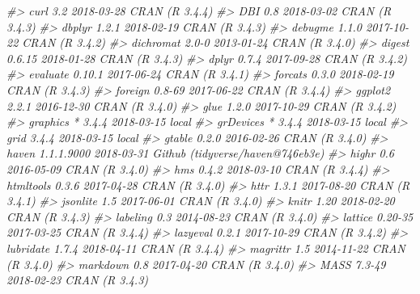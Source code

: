 \documentclass[]{book}
\newenvironment{Shaded}{\begin{snugshade}}{\end{snugshade}}
\newcommand{\CommentTok}[1]{\textcolor[rgb]{0.56,0.35,0.01}{\textit{#1}}}
\theoremstyle{definition}
\theoremstyle{definition}
\theoremstyle{definition}
\theoremstyle{remark}
\begin{document}
\begin{Shaded}
\begin{Highlighting}[]
\CommentTok{#>  curl           3.2        2018-03-28 CRAN (R 3.4.4)                  }
\CommentTok{#>  DBI            0.8        2018-03-02 CRAN (R 3.4.3)                  }
\CommentTok{#>  dbplyr         1.2.1      2018-02-19 CRAN (R 3.4.3)                  }
\CommentTok{#>  debugme        1.1.0      2017-10-22 CRAN (R 3.4.2)                  }
\CommentTok{#>  dichromat      2.0-0      2013-01-24 CRAN (R 3.4.0)                  }
\CommentTok{#>  digest         0.6.15     2018-01-28 CRAN (R 3.4.3)                  }
\CommentTok{#>  dplyr          0.7.4      2017-09-28 CRAN (R 3.4.2)                  }
\CommentTok{#>  evaluate       0.10.1     2017-06-24 CRAN (R 3.4.1)                  }
\CommentTok{#>  forcats        0.3.0      2018-02-19 CRAN (R 3.4.3)                  }
\CommentTok{#>  foreign        0.8-69     2017-06-22 CRAN (R 3.4.4)                  }
\CommentTok{#>  ggplot2        2.2.1      2016-12-30 CRAN (R 3.4.0)                  }
\CommentTok{#>  glue           1.2.0      2017-10-29 CRAN (R 3.4.2)                  }
\CommentTok{#>  graphics     * 3.4.4      2018-03-15 local                           }
\CommentTok{#>  grDevices    * 3.4.4      2018-03-15 local                           }
\CommentTok{#>  grid           3.4.4      2018-03-15 local                           }
\CommentTok{#>  gtable         0.2.0      2016-02-26 CRAN (R 3.4.0)                  }
\CommentTok{#>  haven          1.1.1.9000 2018-03-31 Github (tidyverse/haven@746eb3e)}
\CommentTok{#>  highr          0.6        2016-05-09 CRAN (R 3.4.0)                  }
\CommentTok{#>  hms            0.4.2      2018-03-10 CRAN (R 3.4.4)                  }
\CommentTok{#>  htmltools      0.3.6      2017-04-28 CRAN (R 3.4.0)                  }
\CommentTok{#>  httr           1.3.1      2017-08-20 CRAN (R 3.4.1)                  }
\CommentTok{#>  jsonlite       1.5        2017-06-01 CRAN (R 3.4.0)                  }
\CommentTok{#>  knitr          1.20       2018-02-20 CRAN (R 3.4.3)                  }
\CommentTok{#>  labeling       0.3        2014-08-23 CRAN (R 3.4.0)                  }
\CommentTok{#>  lattice        0.20-35    2017-03-25 CRAN (R 3.4.4)                  }
\CommentTok{#>  lazyeval       0.2.1      2017-10-29 CRAN (R 3.4.2)                  }
\CommentTok{#>  lubridate      1.7.4      2018-04-11 CRAN (R 3.4.4)                  }
\CommentTok{#>  magrittr       1.5        2014-11-22 CRAN (R 3.4.0)                  }
\CommentTok{#>  markdown       0.8        2017-04-20 CRAN (R 3.4.0)                  }
\CommentTok{#>  MASS           7.3-49     2018-02-23 CRAN (R 3.4.3)                  }

\end{Highlighting}
\end{Shaded}
\end{document}
